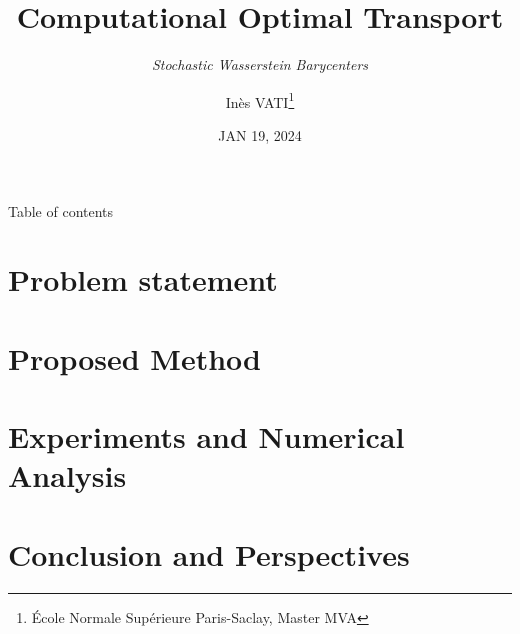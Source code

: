\documentclass[hyperref={pdftex}]{beamer}
\title{Computational Optimal Transport}
\subtitle{\textit{Stochastic Wasserstein Barycenters}}
\author{Inès VATI\thanks{École Normale Supérieure Paris-Saclay, Master MVA}} %
\institute[MVA]{\texttt{[image: figures/mva logo.png]}}
\date{ JAN 19, 2024 } %
\begin{document}
\frame[plain]{\titlepage}

\begin{frame}{Table of contents}
  \tableofcontents
\end{frame}

\section{Problem statement}


\section{Proposed Method}



\section{Experiments and Numerical Analysis}



\section{Conclusion and Perspectives}

\end{document}
